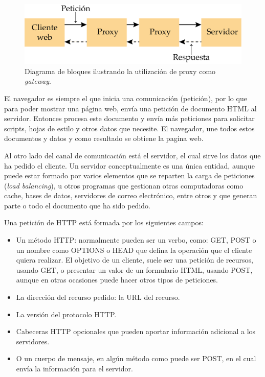 \begin{figure}[htpb]
	\centering
	\includegraphics[scale=.80]{./Figures/server-proxy.png}
	\caption[Utilización de proxy como  \textit{gateway}.  ]{Diagrama de bloques ilustrando la utilización de proxy como  \textit{gateway}.}
	\label{fig:server-proxy}
\end{figure}


El navegador es siempre el que inicia una comunicación (petición), por lo que para poder mostrar una página web, envía una petición de documento HTML al servidor. Entonces procesa este documento y envía más peticiones para solicitar scripts, hojas de estilo y otros datos que necesite. El navegador, une todos estos documentos y datos y como resultado se obtiene la pagina web. 

Al otro lado del canal de comunicación está el servidor, el cual sirve los datos que ha pedido el cliente. Un servidor conceptualmente es una única entidad, aunque puede estar formado por varios elementos que se reparten la carga de peticiones (\textit{load balancing}), u otros programas que gestionan otras computadoras como cache, bases de datos, servidores de correo electrónico, entre otros y que generan parte o todo el documento que ha sido pedido. 

Una petición de HTTP está formada por los siguientes campos:

\begin{itemize}
	\item Un método HTTP: normalmente pueden ser un verbo, como: GET, POST o un nombre como OPTIONS o HEAD que defina la operación que el cliente quiera realizar. El objetivo de un cliente, suele ser una petición de recursos, usando GET, o presentar un valor de un formulario HTML, usando POST, aunque en otras ocasiones puede hacer otros tipos de peticiones. 
	
	\item La dirección del recurso pedido: la URL del recurso.
	
	\item La versión del protocolo HTTP.
	
	\item Cabeceras HTTP opcionales que pueden aportar información adicional a los servidores.
	
	\item O un cuerpo de mensaje, en algún método como puede ser POST, en el cual envía la información para el servidor.
	
\end{itemize}

